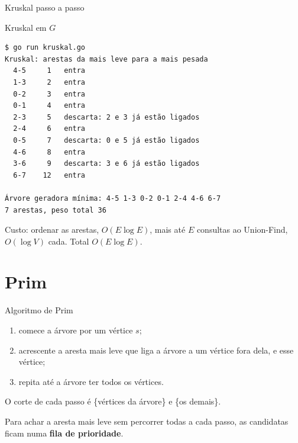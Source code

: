 \documentclass{beamer}
\begin{document}
\begin{frame}{Kruskal passo a passo}
	\begin{center}
	\end{center}
\end{frame}

\begin{frame}[fragile]{Kruskal em $G$}
	\begin{verbatim}
$ go run kruskal.go
Kruskal: arestas da mais leve para a mais pesada
  4-5     1   entra
  1-3     2   entra
  0-2     3   entra
  0-1     4   entra
  2-3     5   descarta: 2 e 3 já estão ligados
  2-4     6   entra
  0-5     7   descarta: 0 e 5 já estão ligados
  4-6     8   entra
  3-6     9   descarta: 3 e 6 já estão ligados
  6-7    12   entra

Árvore geradora mínima: 4-5 1-3 0-2 0-1 2-4 4-6 6-7
7 arestas, peso total 36
\end{verbatim}
	\footnotesize
	Custo: ordenar as arestas, $O(E \log E)$, mais até $E$ consultas ao
	Union-Find, $O(\log V)$ cada. Total $O(E \log E)$.
\end{frame}

\section{Prim}

\begin{frame}{Algoritmo de Prim}
	\begin{enumerate}
		\item comece a árvore por um vértice $s$;
		\item acrescente a aresta mais leve que liga a árvore a um vértice fora
		      dela, e esse vértice;
		\item repita até a árvore ter todos os vértices.
	\end{enumerate}

	\vspace{0.3cm}
	O corte de cada passo é \{vértices da árvore\} e \{os demais\}.

	\vspace{0.3cm}
	Para achar a aresta mais leve sem percorrer todas a cada passo, as
	candidatas ficam numa \textbf{fila de prioridade}.
\end{frame}
\end{document}
